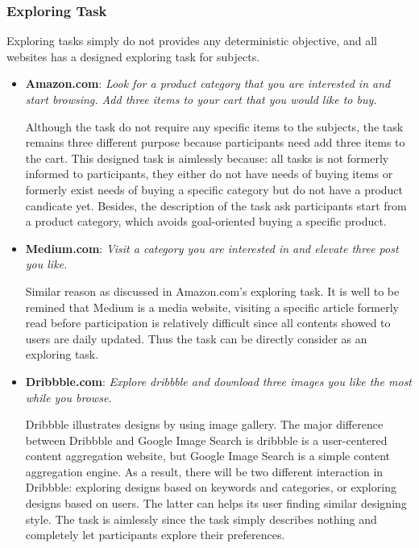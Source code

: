 \subsubsection{Exploring Task}

Exploring tasks simply do not provides any deterministic objective,
and all websites has a designed exploring task for subjects.

\begin{itemize}
    \item \textbf{Amazon.com}: \emph{Look for a product category that you are interested in and start browsing. 
        Add three items to your cart that you would like to buy.}

        Although the task do not require any specific items to the subjects, the task remains three different
        purpose because participants need add three items to the cart. This designed task 
        is aimlessly because: all tasks is not formerly informed to participants, 
        they either do not have needs of buying items or 
        formerly exist needs of buying a specific category but do not have a product candicate yet.
        Besides, the description of the task ask participants start from a product category, which avoids 
        goal-oriented buying a specific product.

    \item \textbf{Medium.com}: \emph{Visit a category you are interested in and elevate three post you like.}

        Similar reason as discussed in Amazon.com's exploring task. It is well to be remined that Medium is a media
        website, visiting a specific article formerly read before participation is relatively difficult 
        since all contents showed to users are daily updated. Thus the task can be directly consider as an exploring task.

    \item \textbf{Dribbble.com}: \emph{Explore dribbble and download three images you like the most while you browse.}

        Dribbble illustrates designs by using image gallery. The major difference between Dribbble and Google Image Search
        is dribbble is a user-centered content aggregation website, but Google Image Search is a simple content aggregation engine.
        As a result, there will be two different interaction in Dribbble: exploring designs based on keywords and categories,
        or exploring designs based on users. The latter can helps its user finding similar designing style.
        The task is aimlessly since the task simply describes nothing and completely let participants explore their preferences.

\end{itemize}

